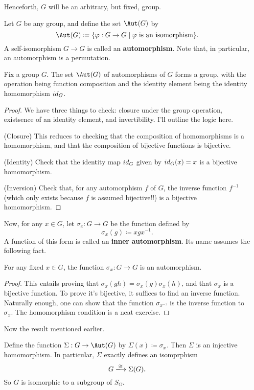 Henceforth, $G$ will be an arbitrary, but fixed, group.

\begin{definition}
    Let $G$ be any group, and define the set $\Aut(G)$ by
    \[
        \Aut(G) \coloneq \{ \phi: G\to G \mid \text{$\phi$ is an isomorphism}\}.
    \]
    A self-isomorphism $G\to G$ is called an {\bf automorphism}.
    Note that, in particular, an automorphism is a permutation.
\end{definition}

\begin{proposition}
    Fix a group $G$. The set $\Aut(G)$ of automorphisms of $G$ forms a group,
    with the operation being function composition and the identity element being
    the identity homomorphism $id_G$.
\end{proposition}

\begin{proof}
    We have three things to check: 
    closure under the group operation, 
    existsence of an identity element,
    and invertibility.
    I'll outline the logic here.

    (Closure) This reduces to checking that the composition of homomorphisms is a homomorphism,
    and that the composition of bijective functions is bijective.

    (Identity) Check that the identity map $id_G$ given by $id_G(x)=x$ is a bijective homomorphism.

    (Inversion) Check that, for any automorphism $f$ of $G$, the inverse function $f^{-1}$ 
    (which only exists because $f$ is assumed bijective!!) is a bijective homomorphism.
\end{proof}

Now, for any $x\in G$, let $\sigma_x: G\to G$ be the function defined by
\[
    \sigma_x(g) \coloneq xgx^{-1}.
\]
A function of this form is called an {\bf inner automorphism}.
Its name assumes the following fact.

\begin{proposition}
    For any fixed $x\in G$, the function $\sigma_x:G\to G$ is an automorphism.
\end{proposition}
\begin{proof}
    This entails proving that $\sigma_x(gh) = \sigma_x(g)\sigma_x(h)$, and that $\sigma_x$ is a bijective function.
    To prove it's bijective, it suffices to find an inverse function.
    Naturally enough, one can show that the function $\sigma_{x^{-1}}$ is the inverse function to $\sigma_x$.
    The homomorphism condition is a neat exercise.
\end{proof}

Now the result mentioned earlier.

\begin{theorem}
    Define the function $\Sigma:G \to \Aut(G)$ by $\Sigma(x) \coloneq \sigma_x$.
    Then $\Sigma$ is an injective homomorphism.
    In particular, $\Sigma$ exactly defines an isomprphism
    \[
        G \xlongrightarrow{\cong} \Sigma(G).
    \]
    So $G$ is isomorphic to a subgroup of $S_G$.
\end{theorem}